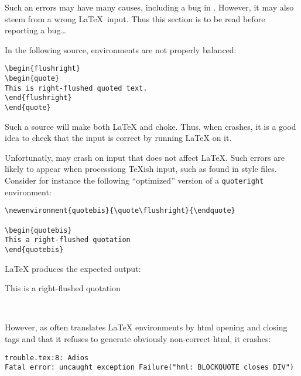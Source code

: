 \documentclass{article}
\newenvironment{latexout}{\begin{htmlout}}{\end{htmlout}}
\begin{document}
Such an errors may have many causes, including a bug in \htmlgen.
However, it may also steem from a wrong \LaTeX\ input.
Thus this section is to be read before reporting a bug\ldots

In  the following source, environments are not properly balanced:
\begin{verbatim}
\begin{flushright}
\begin{quote}
This is right-flushed quoted text.
\end{flushright}
\end{quote}
\end{verbatim}
Such a source will make both {\LaTeX} and {\htmlgen} choke.
Thus, when {\htmlgen} crashes, it is a good idea to check that the
input is correct by running {\LaTeX} on it.


Unfortunatly, {\htmlgen} may crash on input that does not affect
\LaTeX.
Such errors are likely to appear when processiong {\TeX}ish input,
such as found in style files.
Consider for instance the following ``optimized'' version of a
\verb+quoteright+  environment:
\begin{verbatim}
\newenvironment{quotebis}{\quote\flushright}{\endquote}

\begin{quotebis}
This a right-flushed quotation
\end{quotebis}
\end{verbatim}

{\LaTeX} produces the expected output:
\begin{latexout}
\begin{toimage}
\newenvironment{quotebis}{\quote\flushright}{\endquote}
\begin{quotebis}
This is a right-flushed quotation
\end{quotebis}
\end{toimage}\imageflush[ALIGN=right]\\
\end{latexout}

However, as {\htmlgen} often translates {\LaTeX} environments by html
opening and  closing tags and that it refuses to generate obviously
non-correct html, it crashes:
\begin{verbatim}
trouble.tex:8: Adios
Fatal error: uncaught exception Failure("hml: BLOCKQUOTE closes DIV")
\end{verbatim}
\end{document}
